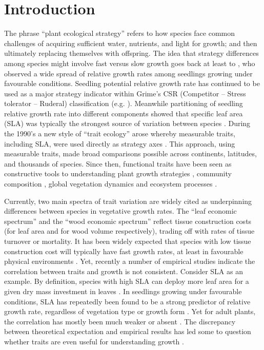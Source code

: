 \documentclass[a4paper,11pt]{article}
\begin{document}
\section*{Introduction}\label{introduction}

The phrase ``plant ecological strategy'' refers to how species face common challenges of acquiring sufficient water, nutrients, and light for growth; and then ultimately replacing themselves with offspring. The idea that strategy differences among species might involve fast versus slow growth goes back at least to \citet{Grime:1975gr}, who observed a wide spread of relative growth rates among seedlings growing under favourable conditions. Seedling potential relative growth rate has continued to be used as a major strategy indicator within Grime's CSR (Competitor -- Stress tolerator -- Ruderal) classification (e.g. \citealt{grime1979plant, Grime:1997wm}). Meanwhile partitioning of seedling relative growth rate into different components showed that specific leaf area (SLA) was typically the strongest source of variation between species \citep{Poorter:1989tx, Rees:2010gk}. During the 1990's a new style of ``trait ecology'' arose whereby measurable traits, including SLA, were used directly as strategy axes \citep{Westoby:2002ft}. This approach, using measurable traits, made broad comparisons possible across continents, latitudes, and thousands of species. Since then, functional traits have been seen as constructive tools to understanding plant growth strategies \citep{Westoby:2002ft}, community composition \citep{Lavorel:2002ff,Shipley:2006ie}, global vegetation dynamics \citep{Scheiter:2013ed} and ecosystem processes \citep{Lavorel:2002ff}.

Currently, two main spectra of trait variation are widely cited as underpinning differences between species in vegetative growth rates. The ``leaf economic spectrum'' \citep{Wright:2004jb} and the ``wood economic spectrum'' \citep{Chave:2009iy} reflect tissue construction costs (for leaf area and for wood volume respectively), trading off with rates of tissue turnover or mortality. It has been widely expected that species with low tissue construction cost will typically have fast growth rates, at least in favourable physical environments \citep[e.g.][]{MullerLandau:2004dc,Poorter:2008iu,Chave:2009iy,Larjavaara:2010bn,Iida:2012jb,Paine:2015df}. Yet, recently a number of empirical studies indicate the correlation between traits and growth is not consistent. Consider SLA as an example. By definition, species with high SLA can deploy more leaf area for a given dry mass investment in leaves \citep{Poorter:1999wd, Reich:1992wm}. In seedlings growing under favourable conditions, SLA has repeatedly been found to be a strong predictor of relative growth rate, regardless of vegetation type or growth form \citep{Lambers:1992bj,Reich:1992wm,Grime:1997wm,Poorter:1999wd,Wright:1999ds}. Yet for adult plants, the correlation has mostly been much weaker or absent \citep{coomes_comparison_1998,Poorter:2008iu,Aiba:2009ft,Easdale:2009gv,Wright:2010tp}. The discrepancy between theoretical expectation and empirical results has led some to question whether traits are even useful for understanding growth \citep{Wright:2010tp, Paine:2015df}.
\end{document}
